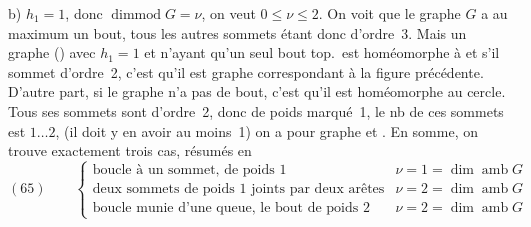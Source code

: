 \documentclass[11pt,a4paper]{article}
\begin{document}
b) $h_1 = 1$, donc $\operatorname{dimmod} G = \nu$, on veut $0 \leqslant \nu \leqslant 2$. On voit que le graphe $G$ a au maximum un bout, tous les autres sommets étant donc d'ordre~3. \struck{\ill{}} Mais un graphe () avec $h_1 = 1$ et n'ayant qu'un seul bout top.\ est homéomorphe à
et s'il \struck{\ill{}}  sommet d'ordre~2, c'est qu'il est  graphe \struck{\ill{}}  correspondant à la figure précédente. D'autre part, si le graphe n'a pas de bout, c'est qu'il est homéomorphe au cercle. Tous ses sommets sont d'ordre~2, donc de poids marqué~1, le nb de ces sommets  est  $1 \ldots 2$, (il doit y en avoir au moins~1) on a pour graphe  et . En somme, on trouve exactement trois cas, résumés en
\[
(65)\qquad
\left\{
\begin{array}{ll}
\text{boucle à un sommet, de poids } 1 & \nu = 1 = \dim \operatorname{amb} G \\[2pt]
\text{deux sommets de poids } 1 \text{ joints par deux arêtes} & \nu = 2 = \dim \operatorname{amb} G \\[2pt]
\text{boucle munie d'une queue, le bout de poids } 2 & \nu = 2 = \dim \operatorname{amb} G
\end{array}
\right.
\]
\end{document}
